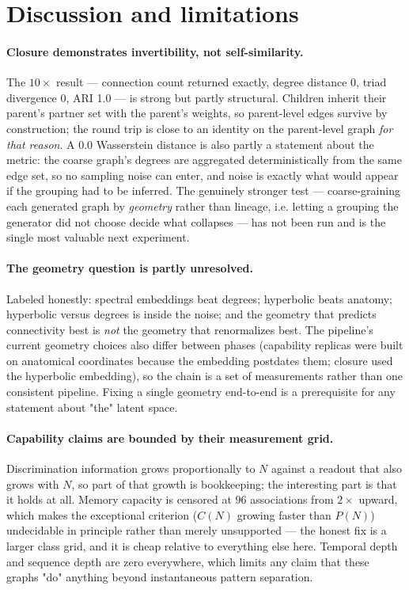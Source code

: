 \documentclass[11pt,a4paper]{article}
\begin{document}
\section{Discussion and limitations}
\label{sec:limits}

\paragraph{Closure demonstrates invertibility, not self-similarity.}
The $10\times$ result --- connection count returned exactly, degree distance 0, triad divergence 0,
ARI 1.0 --- is strong but partly structural. Children inherit their parent's partner set with the
parent's weights, so parent-level edges survive by construction; the round trip is close to an
identity on the parent-level graph \emph{for that reason}. A 0.0 Wasserstein distance is also
partly a statement about the metric: the coarse graph's degrees are aggregated deterministically
from the same edge set, so no sampling noise can enter, and noise is exactly what would appear if
the grouping had to be inferred. The genuinely stronger test --- coarse-graining each generated
graph by \emph{geometry} rather than lineage, i.e. letting a grouping the generator did not
choose decide what collapses --- has not been run and is the single most valuable next experiment.

\paragraph{The geometry question is partly unresolved.}
Labeled honestly: spectral embeddings beat degrees; hyperbolic beats anatomy; hyperbolic versus
degrees is inside the noise; and the geometry that predicts connectivity best is \emph{not} the
geometry that renormalizes best. The pipeline's current geometry choices also differ between
phases (capability replicas were built on anatomical coordinates because the embedding postdates
them; closure used the hyperbolic embedding), so the chain is a set of measurements rather than
one consistent pipeline. Fixing a single geometry end-to-end is a prerequisite for any statement
about "the" latent space.

\paragraph{Capability claims are bounded by their measurement grid.}
Discrimination information grows proportionally to $N$ against a readout that also grows with $N$,
so part of that growth is bookkeeping; the interesting part is that it holds at all. Memory
capacity is censored at 96 associations from $2\times$ upward, which makes the exceptional
criterion ($C(N)$ growing faster than $P(N)$) undecidable in principle rather than merely
unsupported --- the honest fix is a larger class grid, and it is cheap relative to everything else
here. Temporal depth and sequence depth are zero everywhere, which limits any claim that these
graphs "do" anything beyond instantaneous pattern separation.
\end{document}

